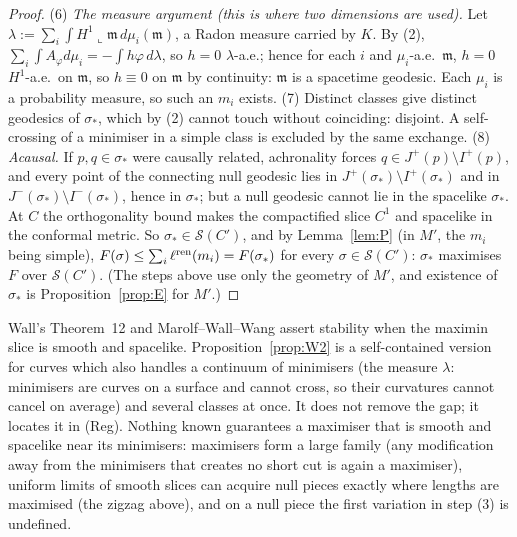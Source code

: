 \documentclass[aps,prd,onecolumn,superscriptaddress,nofootinbib,amsmath,amssymb,11pt]{revtex4-2}
\theoremstyle{definition}
\begin{document}
\begin{proof}
(6) \emph{The measure argument (this is where two dimensions are used).} Let $\lambda:=\sum_i\int H^1\llcorner\mathfrak m\,d\mu_i(\mathfrak m)$, a Radon
measure carried by $K$. By (2), $\sum_i\int A_\varphi d\mu_i=-\int h\varphi\,d\lambda$, so $h=0$ $\lambda$-a.e.; hence for each $i$ and $\mu_i$-a.e.\ $\mathfrak m$,
$h=0$ $H^1$-a.e.\ on $\mathfrak m$, so $h\equiv0$ on $\mathfrak m$ by continuity: $\mathfrak m$ is a spacetime geodesic. Each $\mu_i$ is a probability measure,
so such an $m_i$ exists.
(7) Distinct classes give distinct geodesics of $\sigma_*$, which by (2) cannot touch without coinciding: disjoint. A self-crossing of
a minimiser in a simple class is excluded by the same exchange.
(8) \emph{Acausal.} If $p,q\in\sigma_*$ were causally related, achronality forces $q\in J^+(p)\setminus I^+(p)$, and every point of the
connecting null geodesic lies in $J^+(\sigma_*)\setminus I^+(\sigma_*)$ and in $J^-(\sigma_*)\setminus I^-(\sigma_*)$, hence in $\sigma_*$; but a null
geodesic cannot lie in the spacelike $\sigma_*$. At $C$ the orthogonality bound makes the compactified slice $C^1$ and spacelike in the
conformal metric. So $\sigma_*\in\mathcal S(C')$, and by Lemma~\ref{lem:P} (in $M'$, the $m_i$ being simple),
$F(\sigma)\le\sum_i\ell^{\rm ren}(m_i)=F(\sigma_*)$ for every $\sigma\in\mathcal S(C')$: $\sigma_*$ maximises $F$ over $\mathcal S(C')$. (The steps
above use only the geometry of $M'$, and existence of $\sigma_*$ is Proposition~\ref{prop:E} for $M'$.)
\end{proof}

Wall's Theorem~12 and Marolf--Wall--Wang assert stability when the maximin slice is smooth and spacelike. Proposition~\ref{prop:W2} is
a self-contained version for curves which also handles a continuum of minimisers (the measure $\lambda$: minimisers are curves on a
surface and cannot cross, so their curvatures cannot cancel on average) and several classes at once. It does not remove the gap; it
locates it in (Reg). Nothing known guarantees a maximiser that is smooth and spacelike near its minimisers: maximisers form a large
family (any modification away from the minimisers that creates no short cut is again a maximiser), uniform limits of smooth slices
can acquire null pieces exactly where lengths are maximised (the zigzag above), and on a null piece the first variation in step (3)
is undefined.
\end{document}
